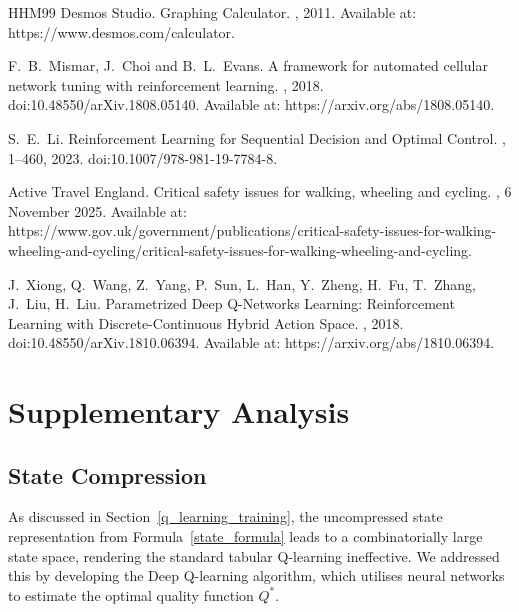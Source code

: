 \documentclass[a4paper]{report}
\begin{document}
\begin{thebibliography}{HHM99}
Desmos Studio.
\newblock Graphing Calculator.
, 2011.
\newblock Available at:
  https://www.desmos.com/calculator.

F.~B.~Mismar, J.~Choi and B.~L.~Evans.
\newblock A framework for automated cellular network tuning with reinforcement learning.
, 2018.
\newblock doi:10.48550/arXiv.1808.05140.
\newblock Available at:
  https://arxiv.org/abs/1808.05140.

S.~E.~Li.
\newblock Reinforcement Learning for Sequential Decision and Optimal Control.
, 1--460, 2023.
\newblock doi:10.1007/978-981-19-7784-8.

Active Travel England.
\newblock Critical safety issues for walking, wheeling and cycling.
, 6 November 2025.
\newblock Available at:
  https://www.gov.uk/government/publications/critical-safety-issues-for-walking-wheeling-and-cycling/critical-safety-issues-for-walking-wheeling-and-cycling.

J.~Xiong, Q.~Wang, Z.~Yang, P.~Sun, L.~Han, Y.~Zheng, H.~Fu, T.~Zhang, J.~Liu, H.~Liu.
\newblock Parametrized Deep Q-Networks Learning: Reinforcement Learning with Discrete-Continuous Hybrid Action Space.
, 2018.
\newblock doi:10.48550/arXiv.1810.06394.
\newblock Available at:
  https://arxiv.org/abs/1810.06394.

\end{thebibliography}

\chapter{Supplementary Analysis}

\section{State Compression}

As discussed in Section~\ref{q_learning_training}, the uncompressed state representation from Formula~\ref{state_formula} leads to a combinatorially large state space, rendering the standard tabular Q-learning ineffective. We addressed this by developing the Deep Q-learning algorithm, which utilises neural networks to estimate the optimal quality function $Q^*$.
\end{document}
